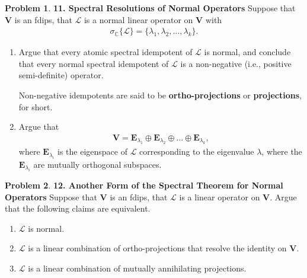 \documentclass{article}
\theoremstyle{definition}
\newtheorem*{prob*}{Problem}
\newcommand{\V}{\mathbf{V}}
\newcommand{\lag}{\mathcal{L}}
\begin{document}
\newpage



\begin{prob*}\textbf{11. Spectral Resolutions of Normal Operators}
	Suppose that $\V$ is an fdips, that $\lag$ is a normal linear operator on $\V$ with 
	\begin{align*}
	\sigma_{\mathbb{C}}\{ \lag\} = \{\lambda_1, \lambda_2,\dots,\lambda_k\}.
	\end{align*}
	\begin{enumerate}
		\item Argue that every atomic spectral idempotent of $\lag$ is normal, and conclude that every normal spectral idempotent of $\lag$ is a non-negative (i.e., positive semi-definite) operator. 
		
		Non-negative idempotents are said to be \textbf{ortho-projections} or \textbf{projections}, for short. 
		
		\item Argue that 
		\begin{align*}
		\V = \mathbf{E}_{\lambda_1} \oplus \mathbf{E}_{\lambda_2} \oplus \dots \oplus \mathbf{E}_{\lambda_k},
		\end{align*}
		where $\mathbf{E}_{\lambda_i}$ is the eigenspace of $\lag$ corresponding to the eigenvalue $\lambda$, where the $\mathbf{E}_{\lambda_i}$ are mutually orthogonal subspaces.  
	\end{enumerate}
	
\end{prob*}







\newpage




\begin{prob*}\textbf{12. Another Form of the Spectral Theorem for Normal Operators}
	Suppose that $\V$ is an fdips, that $\lag$ is a linear operator on $\V$. Argue that the following claims are equivalent. 
	\begin{enumerate}
		\item $\lag$ is normal.
		\item $\lag$ is a linear combination of ortho-projections that resolve the identity on $\V$.
		\item $\lag$ is a linear combination of mutually annihilating projections. 
	\end{enumerate}
	
\end{prob*}
\end{document}
